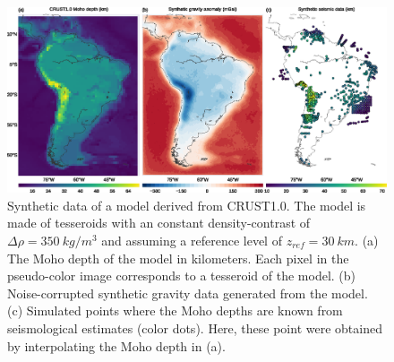 \documentclass[extra,mreferee]{gji}
\begin{document}
\begin{figure}
    \centering
    \includegraphics[width=\textwidth]{figures/synthetic-crust1-data}
    \caption{
        Synthetic data of a model derived from CRUST1.0.
        The model is made of tesseroids with an constant density-contrast
        of $\Delta\rho = 350\ kg/m^3$ and assuming a reference level of
        $z_{ref} = 30\ km$.
        (a) The Moho depth of the model in kilometers.
        Each pixel in the pseudo-color image corresponds to a tesseroid of the
        model.
        (b) Noise-corrupted synthetic gravity data generated from the model.
        (c) Simulated points where the Moho depths are known from seismological
        estimates (color dots).  Here, these point were obtained by
        interpolating the Moho depth in (a).
    }
    \label{fig:crust1-data}
\end{figure}
\end{document}
